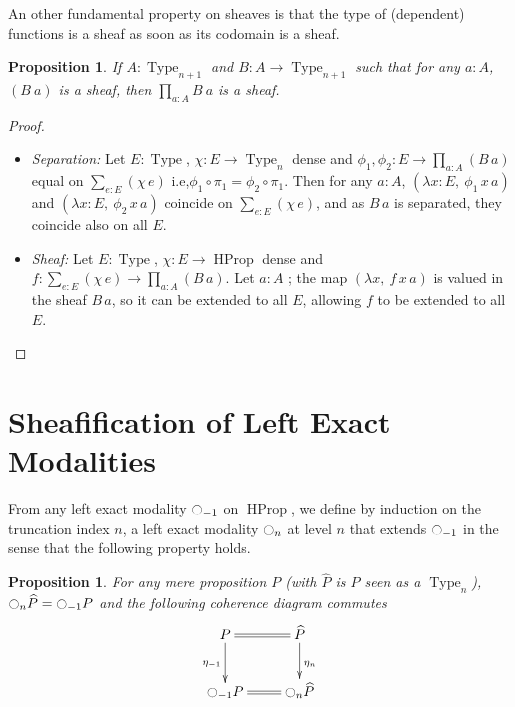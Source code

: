 \documentclass[conference]{IEEEtran}
\newtheorem{prop}[thm]{Proposition}
\newcommand{\mynote}[2]{
    \fbox{\bfseries\sffamily\scriptsize#1}
    {\small$\blacktriangleright$\textsf{\emph{#2}}$\blacktriangleleft$}~}
\newcommand\nt[1]{\mynote{NT}{#1}}
\newcommand{\ie}{i.e,\xspace}
\DeclareMathOperator{\Type}{Type}
\DeclareMathOperator{\HProp}{HProp}
\newcommand{\modal}{\ensuremath{\ocircle}}
\begin{document}
An other fundamental property on sheaves is that the type of (dependent)
functions is a sheaf as soon as its codomain is a sheaf.

\begin{prop}\label{prop:sheaf-forall}
  If $A:\Type_{n+1}$ and $B:A \to \Type_{n+1}$ such that for any
  $a:A$, $(B~a)$ is a sheaf, then $\prod_{a:A}B~a$ is a sheaf.
\end{prop}
\begin{proof}
  \begin{itemize}
  \item {\em Separation:} Let $E:\Type$, $\chi:E \to \Type_n$ dense
    and $\phi_1,\phi_2:E\to \prod_{a:A} (B\, a)$ equal on
    $\sum_{e:E}(\chi\, e)$ \ie $\phi_1\circ \pi_1 = \phi_2\circ
    \pi_1$.
    Then for any $a:A$, $(\lambda x:E,~\phi_1\, x\,
    a)$
    and $(\lambda x:E,~\phi_2\, x\, a)$
    coincide on $\sum_{e:E}(\chi\, e)$, and as $B\, a$ is separated,
    they coincide also on all $E$.
  \item {\em Sheaf:} Let $E:\Type$, $\chi:E\to \HProp$ dense and
    $f:\sum_{e:E} (\chi\, e)\to \prod_{a:A} (B\,a)$. Let $a:A$ ; the
    map $(\lambda x,~f\,x \,a)$ is valued in the sheaf $B\, a$, so it
    can be extended to all $E$, allowing $f$ to be extended to all $E$.
  \end{itemize}
\end{proof}

\section{Sheafification of Left Exact Modalities}
\label{sec:sheafification}


From any left exact modality $\modal_{-1}$ on $\HProp$, we define by
induction on the truncation index $n$, a
left exact modality $\modal_n$ at level $n$ that extends $\modal_{-1}$ in the
sense that the following property holds.
%
\begin{prop}\label{prop:hprop}
  For any mere proposition $P$ (with $\widehat P$ is $P$ seen as a
  $\Type_n$),  $\modal_n \widehat P = \modal_{-1} P$ and the
  following coherence diagram commutes
  $$\xymatrix{
    P \ar@{=}[r] \ar[d]_{\eta_{-1}} & \widehat P \ar[d]^{\eta_n} \\
    \modal_{-1} P \ar@{=}[r] & \modal_n \widehat P 
  }$$
\end{prop}
\end{document}
